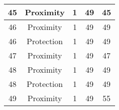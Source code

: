 \documentclass[results.tex]{subfiles}
\begin{document}
\begin{center}
\begin{tabular}{| c || c | c | c | c |}
            \hline
            45                      & Proximity                    & 1                      & 49                      & 45                   \\
            \hline
            46                      & Proximity                    & 1                      & 49                      & 49                   \\
            \hline
            46                      & Protection                   & 1                      & 49                      & 49                   \\
            \hline
            47                      & Proximity                    & 1                      & 49                      & 47                   \\
            \hline
            48                      & Proximity                    & 1                      & 49                      & 49                   \\
            \hline
            48                      & Protection                   & 1                      & 49                      & 49                   \\
            \hline
            49                      & Proximity                    & 1                      & 49                      & 55                   \\
            \hline
        \end{tabular}
    \end{center}
\end{document}
